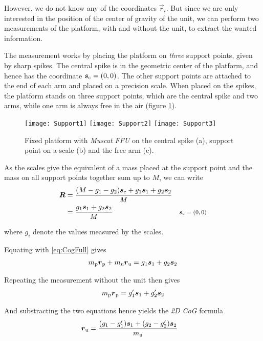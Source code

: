 \documentclass[journal]{IEEEtran}
\begin{document}
However, we do not know any of the coordinates $\vec{r}_i$. 
But since we are only interested in the position of the center of gravity of the unit, we can perform two measurements of the platform, with and without the unit, to extract the wanted information.

The measurement works by placing the platform on \emph{three} support points, given by sharp spikes.
The central spike is in the geometric center of the platform, and hence has the coordinate $\vec{s}_{\textup{c}} = (0, 0)$.
The other support points are attached to the end of each arm and placed on a precision scale. When placed on the spikes, the platform stands on three support points, which are the central spike and two arms, while one arm is always free in the air (figure \ref{fig:Support}).

\begin{figure}[b]
	\centering
	\texttt{[image: Support1]}
	\texttt{[image: Support2]}
	\texttt{[image: Support3]}
	\caption{Fixed platform with \emph{Muscat FFU} on the central spike (a), support point on a scale (b) and the free arm (c).}
	\label{fig:Support}
\end{figure}

As the scales give the equivalent of a mass placed at the support point and the mass on all support points together sum up to $M$, we can write
\begin{align}
	\vec{R} & = \frac{(M - g_1 - g_2) \vec{s}_{\textup{c}} + g_1 \vec{s}_1 + g_2 \vec{s}_2}{M} \\
	& = \frac{g_1 \vec{s}_1 + g_2 \vec{s}_2}{M} & \comment{$\vec{s}_{\textup{c}} = (0,0)$}
\end{align}

where $g_i$ denote the values measured by the scales.

Equating with \eqref{eq:CogFull} gives
\begin{align}
	m_{\textup{p}} \vec{r}_{\textup{p}} + m_{\textup{u}} \vec{r}_{\textup{u}} = g_1 \vec{s}_1 + g_2 \vec{s}_2
\end{align}

Repeating the measurement without the unit then gives
\begin{align}
	m_{\textup{p}} \vec{r}_{\textup{p}} = g_1' \vec{s}_1 + g_2' \vec{s}_2
\end{align}

And substracting the two equations hence yields the \emph{2D CoG} formula
\begin{align}
	\vec{r}_{\textup{u}} & =  \frac{(g_1 - g_1') \vec{s}_1 + (g_2 - g_2') \vec{s}_2}{m_{\textup{u}}}
	\label{eq:2DCoG}
\end{align}
\end{document}

